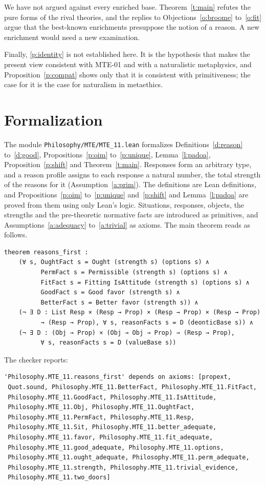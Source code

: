 \documentclass{situationist-preprint}
\begin{document}
We have not argued against every enriched base. Theorem~\ref{t:main} refutes the pure forms of the rival theories, and the replies to Objections~\ref{o:broome} to~\ref{o:fit} argue that the best-known enrichments presuppose the notion of a reason. A new enrichment would need a new examination.

Finally, \ref{p:identity} is not established here. It is the hypothesis that makes the present view consistent with MTE-01 and with a naturalistic metaphysics, and Proposition~\ref{p:compat} shows only that it is consistent with primitiveness; the case for it is the case for naturalism in metaethics.

\section{Formalization}

The module \nolinkurl{Philosophy/MTE/MTE_11.lean} formalizes Definitions~\ref{d:reason} to~\ref{d:good}, Propositions~\ref{p:oim} to~\ref{p:unique}, Lemma~\ref{l:padoa}, Proposition~\ref{p:shift} and Theorem~\ref{t:main}. Responses form an arbitrary type, and a reason profile assigns to each response a natural number, the total strength of the reasons for it (Assumption~\ref{a:prim}). The definitions are Lean definitions, and Propositions~\ref{p:oim} to~\ref{p:unique} and~\ref{p:shift} and Lemma~\ref{l:padoa} are proved from them using only Lean's logic. Situations, responses, objects, the strengths and the pre-theoretic normative facts are introduced as primitives, and Assumptions~\ref{a:adequacy} to~\ref{a:trivial} as axioms. The main theorem reads as follows.

\begin{lstlisting}[basicstyle=\ttfamily\footnotesize]
theorem reasons_first :
    (∀ s, OughtFact s = Ought (strength s) (options s) ∧
          PermFact s = Permissible (strength s) (options s) ∧
          FitFact s = Fitting IsAttitude (strength s) (options s) ∧
          GoodFact s = Good favor (strength s) ∧
          BetterFact s = Better favor (strength s)) ∧
    (¬ ∃ D : List Resp × (Resp → Prop) × (Resp → Prop) × (Resp → Prop)
          → (Resp → Prop), ∀ s, reasonFacts s = D (deonticBase s)) ∧
    (¬ ∃ D : (Obj → Prop) × (Obj → Obj → Prop) → (Resp → Prop),
          ∀ s, reasonFacts s = D (valueBase s))
\end{lstlisting}

\noindent The checker reports:

\begin{lstlisting}[basicstyle=\ttfamily\footnotesize]
'Philosophy.MTE_11.reasons_first' depends on axioms: [propext,
 Quot.sound, Philosophy.MTE_11.BetterFact, Philosophy.MTE_11.FitFact,
 Philosophy.MTE_11.GoodFact, Philosophy.MTE_11.IsAttitude,
 Philosophy.MTE_11.Obj, Philosophy.MTE_11.OughtFact,
 Philosophy.MTE_11.PermFact, Philosophy.MTE_11.Resp,
 Philosophy.MTE_11.Sit, Philosophy.MTE_11.better_adequate,
 Philosophy.MTE_11.favor, Philosophy.MTE_11.fit_adequate,
 Philosophy.MTE_11.good_adequate, Philosophy.MTE_11.options,
 Philosophy.MTE_11.ought_adequate, Philosophy.MTE_11.perm_adequate,
 Philosophy.MTE_11.strength, Philosophy.MTE_11.trivial_evidence,
 Philosophy.MTE_11.two_doors]
\end{lstlisting}
\end{document}
